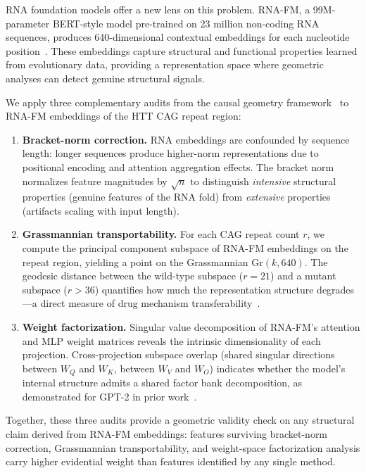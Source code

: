 \documentclass[11pt]{article}
\newcommand{\Gr}{\mathrm{Gr}}
\begin{document}
RNA foundation models offer a new lens on this problem. RNA-FM, a
99M-parameter BERT-style model pre-trained on 23 million non-coding RNA
sequences, produces 640-dimensional contextual embeddings for each
nucleotide position~\citep{rnafm}. These embeddings
capture structural and functional properties learned from evolutionary
data, providing a representation space where geometric analyses can
detect genuine structural signals.

We apply three complementary audits from the causal geometry
framework~\citep{tower2026bn,tower2026grass}
to RNA-FM embeddings of the HTT CAG repeat region:

\begin{enumerate}
\item \textbf{Bracket-norm correction.} RNA embeddings are confounded
  by sequence length: longer sequences produce higher-norm
  representations due to positional encoding and attention aggregation
  effects. The bracket norm~\citep{tower2026bn} normalizes
  feature magnitudes by $\sqrt{n}$ to distinguish \emph{intensive}
  structural properties (genuine features of the RNA fold) from
  \emph{extensive} properties (artifacts scaling with input length).

\item \textbf{Grassmannian transportability.} For each CAG repeat count
  $r$, we compute the principal component subspace of RNA-FM embeddings
  on the repeat region, yielding a point on the Grassmannian
  $\Gr(k, 640)$. The geodesic distance between the wild-type subspace
  ($r = 21$) and a mutant subspace ($r > 36$) quantifies how much the
  representation structure degrades---a direct measure of drug
  mechanism transferability~\citep{tower2026grass}.

\item \textbf{Weight factorization.} Singular value decomposition of
  RNA-FM's attention and MLP weight matrices reveals the intrinsic
  dimensionality of each projection. Cross-projection subspace overlap
  (shared singular directions between $W_Q$ and $W_K$, between $W_V$
  and $W_O$) indicates whether the model's internal structure admits a
  shared factor bank decomposition, as demonstrated for GPT-2 in prior
  work~\citep{tower2026fac}.
\end{enumerate}

Together, these three audits provide a geometric validity check on any
structural claim derived from RNA-FM embeddings: features surviving
bracket-norm correction, Grassmannian transportability, and weight-space
factorization analysis carry higher evidential weight than features
identified by any single method.
\end{document}
